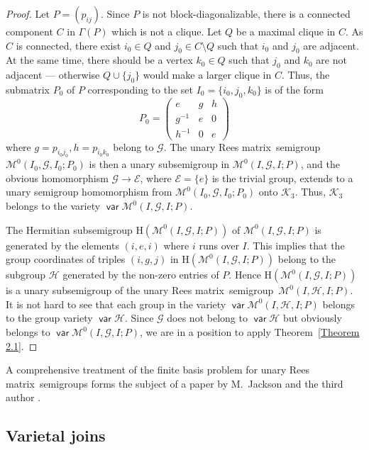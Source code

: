 \documentclass[preprint,1p,times]{elsarticle}
\DeclareMathOperator{\var}{\mathsf{var}}
\numberwithin{equation}{section}
\theoremstyle{remark}
\def\cal{\mathcal}
\def\Mc{{\cal M}}
\def\H{\mathrm H}
\def\Rm{Rees matrix}
\def\sm{semi\-group}
\begin{document}
\begin{proof}
Let $P=(p_{ij})$. Since $P$ is not block-diagonalizable, there is a connected component $C$ in $\Gamma(P)$ which is not
a clique. Let $Q$ be a maximal clique in $C$. As $C$ is connected, there exist $i_0\in Q$ and $j_0\in C\setminus Q$
such that $i_0$ and $j_0$ are adjacent. At the same time, there should be a vertex $k_0\in Q$ such that $j_0$ and $k_0$
are not adjacent --- otherwise $Q\cup\{j_0\}$ would make a larger clique in $C$. Thus, the submatrix $P_0$ of $P$
corresponding to the set $I_0=\{i_0,j_0,k_0\}$ is of the form
$$P_0=\begin{pmatrix}
e      & g & h\\
g^{-1} & e & 0\\
h^{-1} & 0 & e
\end{pmatrix}$$
where $g=p_{i_0j_0},h=p_{i_0k_0}$ belong to $\mathcal{G}$. The unary \Rm\ \sm\ $\Mc^0(I_0,\mathcal{G},I_0;P_0)$ is then
a unary subsemigroup in $\Mc^0(I,\mathcal{G},I;P)$, and the obvious homomorphism $\mathcal{G}\to \mathcal{E}$, where
$\mathcal{E}=\{e\}$ is the trivial group, extends to a unary semigroup homomorphism from
$\Mc^0(I_0,\mathcal{G},I_0;P_0)$ onto $\mathcal{K}_3$. Thus, $\mathcal{K}_3$ belongs to the variety
$\var\Mc^0(I,\mathcal{G},I;P)$.

The Hermitian subsemigroup $\H(\Mc^0(I,\mathcal{G},I;P))$ of $\Mc^0(I,\mathcal{G},I;P)$ is generated by the elements
$(i,e,i)$ where $i$ runs over $I$. This implies that the group coordinates of triples $(i,g,j)$ in
$\H(\Mc^0(I,\mathcal{G},I;P))$ belong to the subgroup $\mathcal{H}$ generated by the non-zero entries of $P$. Hence
$\H(\Mc^0(I,\mathcal{G},I;P))$ is a unary subsemigroup of the unary \Rm\ \sm\ $\Mc^0(I,\mathcal{H},I;P)$. It is not
hard to see that each group in the variety $\var\Mc^0(I,\mathcal{H},I;P)$ belongs to the group variety $\var
\mathcal{H}$. Since $\mathcal{G}$ does not belong to $\var\mathcal{H}$ but obviously belongs to
$\var\Mc^0(I,\mathcal{G},I;P)$, we are in a position to apply Theorem~\ref{Theorem 2.1}.
\end{proof}

A comprehensive treatment of the finite basis problem for unary \Rm\ semigroups forms the subject of a paper by
M.~Jackson and the third author \cite{jacksonvolkov}.

\subsection{Varietal joins}
\end{document}
